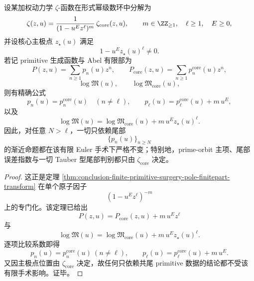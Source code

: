 \begin{theorem}\label{thm:conclusion-finite-euler-surgery-cofinal-tail-rigidity}
设某加权动力学 \(\zeta\)-函数在形式幂级数环中分解为
\[
\zeta(z,u)=\frac{1}{(1-u^{E}z^{\ell})^{m}}\,\zeta_{\mathrm{core}}(z,u),
\qquad
m\in \ZZ_{\ge 1},
\quad
\ell\ge 1,
\quad
E\ge 0,
\]
并设核心主极点 \(z_\star(u)\) 满足
\[
1-u^{E}z_\star(u)^\ell\neq 0.
\]
若记 primitive 生成函数与 Abel 有限部为
\[
P(z,u)=\sum_{n\ge 1}p_n(u)z^n,
\qquad
P_{\mathrm{core}}(z,u)=\sum_{n\ge 1}p_n^{\mathrm{core}}(u)z^n,
\]
\[
\log\mathfrak M(u),
\qquad
\log\mathfrak M_{\mathrm{core}}(u),
\]
则有精确公式
\[
p_n(u)=p_n^{\mathrm{core}}(u)\quad(n\neq \ell),
\qquad
p_\ell(u)=p_\ell^{\mathrm{core}}(u)+m\,u^{E},
\]
以及
\[
\log\mathfrak M(u)
=
\log\mathfrak M_{\mathrm{core}}(u)
+m\,u^{E}z_\star(u)^\ell.
\]
因此，对任意 \(N>\ell\)，一切只依赖尾部
\[
\{p_n(u)\}_{n\ge N}
\]
的渐近命题都在该有限 Euler 手术下严格不变；特别地，prime-orbit 主项、尾部误差指数与一切 Tauber 型尾部判别都只由 \(\zeta_{\mathrm{core}}\) 决定。
\end{theorem}
\begin{proof}
这正是定理 \ref{thm:conclusion-finite-primitive-surgery-pole-finitepart-transform} 在单个原子因子
\[
(1-u^{E}z^\ell)^{-m}
\]
上的专门化。该定理已给出
\[
P(z,u)=P_{\mathrm{core}}(z,u)+m\,u^{E}z^\ell
\]
与
\[
\log\mathfrak M(u)
=
\log\mathfrak M_{\mathrm{core}}(u)
+m\,u^{E}z_\star(u)^\ell.
\]
逐项比较系数即得
\[
p_n(u)=p_n^{\mathrm{core}}(u)\ (n\neq \ell),
\qquad
p_\ell(u)=p_\ell^{\mathrm{core}}(u)+m\,u^E.
\]
又因主极点位置由 \(\zeta_{\mathrm{core}}\) 决定，故任何只依赖共尾 primitive 数据的结论都不受该有限手术影响。证毕。
\end{proof}

